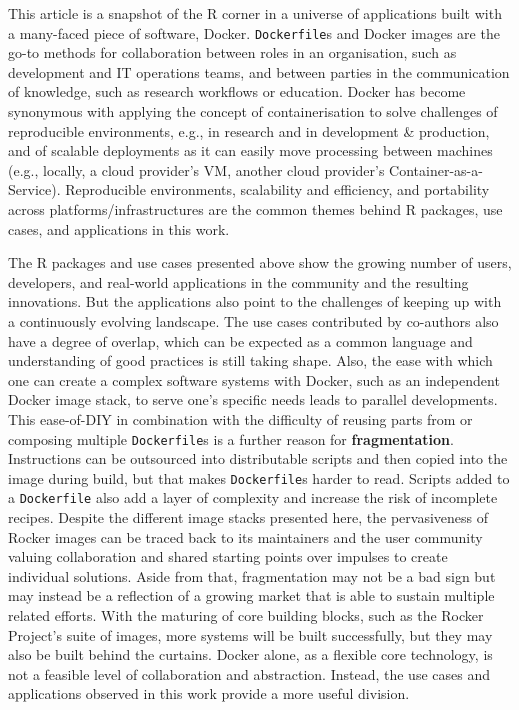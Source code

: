 This article is a snapshot of the R corner in a universe of applications
built with a many-faced piece of software, Docker. \texttt{Dockerfile}s
and Docker images are the go-to methods for collaboration between roles
in an organisation, such as development and IT operations teams, and
between parties in the communication of knowledge, such as research
workflows or education. Docker has become synonymous with applying the
concept of containerisation to solve challenges of reproducible
environments, e.g., in research and in development \& production, and of
scalable deployments as it can easily move processing between machines
(e.g., locally, a cloud provider's VM, another cloud provider's
Container-as-a-Service). Reproducible environments, scalability and
efficiency, and portability across platforms/infrastructures are the
common themes behind R packages, use cases, and applications in this
work.

The R packages and use cases presented above show the growing number of
users, developers, and real-world applications in the community and the
resulting innovations. But the applications also point to the challenges
of keeping up with a continuously evolving landscape. The use cases
contributed by co-authors also have a degree of overlap, which can be
expected as a common language and understanding of good practices is
still taking shape. Also, the ease with which one can create a complex
software systems with Docker, such as an independent Docker image stack,
to serve one's specific needs leads to parallel developments. This
ease-of-DIY in combination with the difficulty of reusing parts from or
composing multiple \texttt{Dockerfile}s is a further reason for
\textbf{fragmentation}. Instructions can be outsourced into
distributable scripts and then copied into the image during build, but
that makes \texttt{Dockerfile}s harder to read. Scripts added to a
\texttt{Dockerfile} also add a layer of complexity and increase the risk
of incomplete recipes. Despite the different image stacks presented
here, the pervasiveness of Rocker images can be traced back to its
maintainers and the user community valuing collaboration and shared
starting points over impulses to create individual solutions. Aside from
that, fragmentation may not be a bad sign but may instead be a
reflection of a growing market that is able to sustain multiple related
efforts. With the maturing of core building blocks, such as the Rocker
Project's suite of images, more systems will be built successfully, but
they may also be built behind the curtains. Docker alone, as a flexible
core technology, is not a feasible level of collaboration and
abstraction. Instead, the use cases and applications observed in this
work provide a more useful division.

